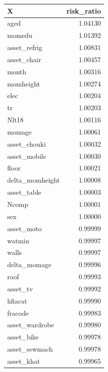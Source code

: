 \documentclass[12pt, krantz2,]{book}
\newenvironment{Shaded}{\begin{snugshade}}{\end{snugshade}}
\newcommand{\ControlFlowTok}[1]{\textcolor[rgb]{0.13,0.29,0.53}{\textbf{#1}}}
\newcommand{\DataTypeTok}[1]{\textcolor[rgb]{0.13,0.29,0.53}{#1}}
\newcommand{\KeywordTok}[1]{\textcolor[rgb]{0.13,0.29,0.53}{\textbf{#1}}}
\newcommand{\NormalTok}[1]{#1}
\newcommand{\OperatorTok}[1]{\textcolor[rgb]{0.81,0.36,0.00}{\textbf{#1}}}
\newcommand{\OtherTok}[1]{\textcolor[rgb]{0.56,0.35,0.01}{#1}}
\newcommand{\StringTok}[1]{\textcolor[rgb]{0.31,0.60,0.02}{#1}}
\theoremstyle{definition}
\theoremstyle{definition}
\theoremstyle{definition}
\newcommand{\1}{\mathbbm{1}}
\begin{document}
\begin{Shaded}
\end{Shaded}

\begin{tabular}{l|r}
\hline
X & risk\_ratio\\
\hline
aged & 1.04130\\
\hline
momedu & 1.01392\\
\hline
asset\_refrig & 1.00831\\
\hline
asset\_chair & 1.00457\\
\hline
month & 1.00316\\
\hline
momheight & 1.00274\\
\hline
elec & 1.00204\\
\hline
tr & 1.00203\\
\hline
Nlt18 & 1.00116\\
\hline
momage & 1.00061\\
\hline
asset\_chouki & 1.00032\\
\hline
asset\_mobile & 1.00030\\
\hline
floor & 1.00021\\
\hline
delta\_momheight & 1.00008\\
\hline
asset\_table & 1.00003\\
\hline
Ncomp & 1.00001\\
\hline
sex & 1.00000\\
\hline
asset\_moto & 0.99999\\
\hline
watmin & 0.99997\\
\hline
walls & 0.99997\\
\hline
delta\_momage & 0.99996\\
\hline
roof & 0.99993\\
\hline
asset\_tv & 0.99992\\
\hline
hfiacat & 0.99990\\
\hline
fracode & 0.99983\\
\hline
asset\_wardrobe & 0.99980\\
\hline
asset\_bike & 0.99978\\
\hline
asset\_sewmach & 0.99978\\
\hline
asset\_khat & 0.99965\\
\hline
\end{tabular}
\end{document}
